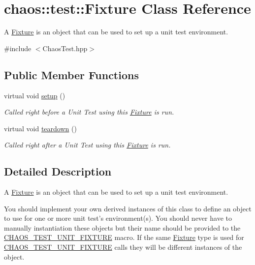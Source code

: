 \hypertarget{classchaos_1_1test_1_1_fixture}{\section{chaos\-:\-:test\-:\-:Fixture Class Reference}
\label{classchaos_1_1test_1_1_fixture}
}


A \hyperlink{classchaos_1_1test_1_1_fixture}{Fixture} is an object that can be used to set up a unit test environment.  




{\ttfamily \#include $<$Chaos\-Test.\-hpp$>$}

\subsection*{Public Member Functions}
\begin{DoxyCompactItemize}
\item 
virtual void \hyperlink{classchaos_1_1test_1_1_fixture_a24819cdf1af94789cb66a95f736f53c5}{setup} ()
\begin{DoxyCompactList}\small\item\em Called right before a Unit Test using this \hyperlink{classchaos_1_1test_1_1_fixture}{Fixture} is run. \end{DoxyCompactList}\item 
virtual void \hyperlink{classchaos_1_1test_1_1_fixture_ae8ea21c5226a988b64f0b2d166bc4a5e}{teardown} ()
\begin{DoxyCompactList}\small\item\em Called right after a Unit Test using this \hyperlink{classchaos_1_1test_1_1_fixture}{Fixture} is run. \end{DoxyCompactList}\end{DoxyCompactItemize}


\subsection{Detailed Description}
A \hyperlink{classchaos_1_1test_1_1_fixture}{Fixture} is an object that can be used to set up a unit test environment. 

You should implement your own derived instances of this class to define an object to use for one or more unit test's environment(s). You should never have to manually instantiation these objects but their name should be provided to the \hyperlink{_chaos_test_8hpp_a96207da4bfdcf1962004e3cdbdf9e220}{C\-H\-A\-O\-S\-\_\-\-T\-E\-S\-T\-\_\-\-U\-N\-I\-T\-\_\-\-F\-I\-X\-T\-U\-R\-E} macro. If the same \hyperlink{classchaos_1_1test_1_1_fixture}{Fixture} type is used for \hyperlink{_chaos_test_8hpp_a96207da4bfdcf1962004e3cdbdf9e220}{C\-H\-A\-O\-S\-\_\-\-T\-E\-S\-T\-\_\-\-U\-N\-I\-T\-\_\-\-F\-I\-X\-T\-U\-R\-E} calls they will be different instances of the object. 

